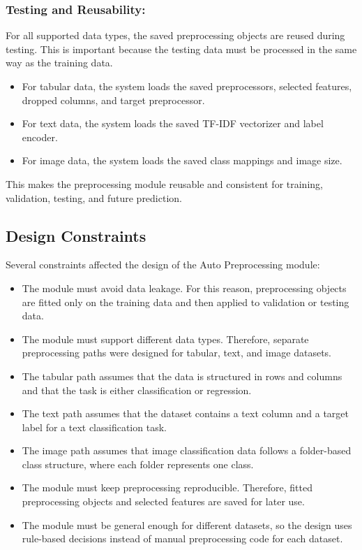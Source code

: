 \documentclass[12pt,a4paper]{report}
\begin{document}
\subsubsection{Testing and Reusability:}

For all supported data types, the saved preprocessing objects are reused during
testing. This is important because the testing data must be processed in the same way
as the training data.

\begin{itemize}
    \item For tabular data, the system loads the saved preprocessors, selected features,
    dropped columns, and target preprocessor.
    \item For text data, the system loads the saved TF-IDF vectorizer and label encoder.
    \item For image data, the system loads the saved class mappings and image size.
\end{itemize}

This makes the preprocessing module reusable and consistent for training,
validation, testing, and future prediction.

\subsection{Design Constraints}
Several constraints affected the design of the Auto Preprocessing module:

\begin{itemize}
  \item The module must avoid data leakage. For this reason, preprocessing
  objects are fitted only on the training data and then applied to validation
  or testing data.

  \item The module must support different data types. Therefore, separate
  preprocessing paths were designed for tabular, text, and image datasets.

  \item The tabular path assumes that the data is structured in rows and
  columns and that the task is either classification or regression.

  \item The text path assumes that the dataset contains a text column and a
  target label for a text classification task.

  \item The image path assumes that image classification data follows a
  folder-based class structure, where each folder represents one class.

  \item The module must keep preprocessing reproducible. Therefore, fitted
  preprocessing objects and selected features are saved for later use.

  \item The module must be general enough for different datasets, so the design
  uses rule-based decisions instead of manual preprocessing code for each
  dataset.
\end{itemize}
\end{document}
